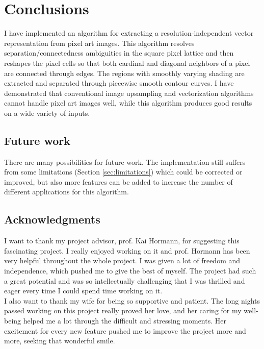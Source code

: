 \documentclass[]{usiinfbachelorproject}
\begin{document}
\newpage
\section{Conclusions} \label{sec:conclusions}

I have implemented an algorithm for extracting a resolution-independent vector representation from pixel art images. This algorithm resolves separation/connectedness ambiguities in the square pixel lattice and then reshapes the pixel cells so that both cardinal and diagonal neighbors of a pixel are connected through edges. The regions with smoothly varying shading are extracted and separated through piecewise smooth contour curves. I have demonstrated that conventional image upsampling and vectorization algorithms cannot handle pixel art images well, while this algorithm produces good results on a wide variety of inputs.


\subsection{Future work} \label{sec:future}

There are many possibilities for future work. The implementation still suffers from some limitations (Section \ref{sec:limitations}) which could be corrected or improved, but also more features can be added to increase the number of different applications for this algorithm.


\subsection{Acknowledgments}

I want to thank my project advisor, prof. Kai Hormann, for suggesting this fascinating project. I really enjoyed working on it and prof. Hormann has been very helpful throughout the whole project. I was given a lot of freedom and independence, which pushed me to give the best of myself. The project had such a great potential and was so intellectually challenging that I was thrilled and eager every time I could spend time working on it.\\
I also want to thank my wife for being so supportive and patient. The long nights passed working on this project really proved her love, and her caring for my well-being helped me a lot through the difficult and stressing moments. Her excitement for every new feature pushed me to improve the project more and more, seeking that wonderful smile.



\end{document}
